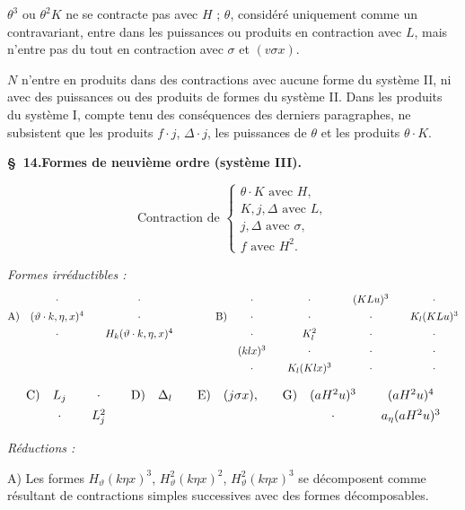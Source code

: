 \documentclass[11pt]{article}
\newcommand{\A}{\Delta}
\begin{document}
$\theta^3$ ou $\theta^2K$ ne se contracte pas avec $H$ ; $\theta$, considéré uniquement comme un contravariant, entre dans les puissances ou produits en contraction avec $L$, mais n'entre pas du tout en contraction avec $\sigma$ et $(v\sigma x)$.

$N$ n'entre en produits dans des contractions avec aucune forme du système II, ni avec des puissances ou des produits de formes du système II. Dans les produits du système I, compte tenu des conséquences des derniers paragraphes, ne subsistent que les produits $f\cdot j$, $\A\cdot j$, les puissances de $\theta$ et les produits $\theta\cdot K$.

\begin{center}
\textbf{\S\ 14.\quad Formes de neuvième ordre (système III).}
\end{center}
\[
\text{Contraction de }\left\{\begin{array}{l}
\theta\cdot K\text{ avec }H,\\
K,j,\A\text{ avec }L,\\
j,\A\text{ avec }\sigma,\\
f\text{ avec }H^2.
\end{array}\right.
\]

\noindent\emph{Formes irréductibles :}
\[
\renewcommand{\arraystretch}{1.35}
\begin{array}{@{}r@{\quad}c@{\qquad}c@{\qquad\qquad}r@{\quad}c@{\qquad}c@{\qquad}c@{\qquad}c@{}}
&\cdot&\cdot&&\cdot&\cdot&(KLu)^3&\cdot\\
\text{A)}&(\vartheta\cdot k,\eta,x)^4&\cdot&\text{B)}&\cdot&\cdot&\cdot&K_l(KLu)^3\\
&\cdot&H_k(\vartheta\cdot k,\eta,x)^4&&\cdot&K_l^2&\cdot&\cdot\\
&&&&(klx)^3&\cdot&\cdot&\cdot\\
&&&&\cdot&K_l(Klx)^3&\cdot&\cdot
\end{array}
\]
\[
\renewcommand{\arraystretch}{1.35}
\begin{array}{@{}r@{\quad}c@{\qquad}c@{\qquad}r@{\quad}c@{\qquad}r@{\quad}c@{\qquad}r@{\quad}c@{\qquad}c@{}}
\text{C)}&L_j&\cdot&\text{D)}&\A_l&\text{E)}&(j\sigma x),&\text{G)}&(aH^2u)^3&(aH^2u)^4\\
&\cdot&L_j^2&&&&&&\cdot&a_\eta(aH^2u)^3
\end{array}
\]

\noindent\emph{Réductions :}

A) Les formes $H_\vartheta(k\eta x)^3$, $H_\vartheta^2(k\eta x)^2$, $H_\vartheta^2(k\eta x)^3$ se décomposent comme résultant de contractions simples successives avec des formes décomposables.
\end{document}
